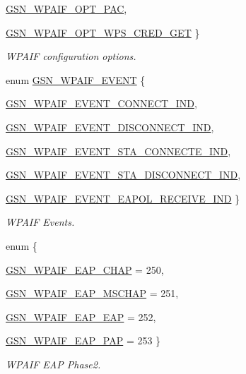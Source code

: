 \begin{DoxyCompactItemize}
\par
\hyperlink{a00687_gga0f2a6686511220638235644511dee215ad7faa17670befa8fc80e316af9a3b733}{GSN\_\-WPAIF\_\-OPT\_\-PAC}, 
\par
\hyperlink{a00687_gga0f2a6686511220638235644511dee215af3bd357d3a9d824dd1e977d66c831f8d}{GSN\_\-WPAIF\_\-OPT\_\-WPS\_\-CRED\_\-GET}
 \}
\begin{DoxyCompactList}\small\item\em WPAIF configuration options. \end{DoxyCompactList}\item 
enum \hyperlink{a00687_gab34b81549296cd8fc0728be0cfa16e87}{GSN\_\-WPAIF\_\-EVENT} \{ \par
\hyperlink{a00687_ggab34b81549296cd8fc0728be0cfa16e87adf4f66b0da0bcca3db633796f43d1222}{GSN\_\-WPAIF\_\-EVENT\_\-CONNECT\_\-IND}, 
\par
\hyperlink{a00687_ggab34b81549296cd8fc0728be0cfa16e87a63abaaa5c7d17b4afc4dff551a26bfa4}{GSN\_\-WPAIF\_\-EVENT\_\-DISCONNECT\_\-IND}, 
\par
\hyperlink{a00687_ggab34b81549296cd8fc0728be0cfa16e87a4b28b3c400f21b493ec3d005b365a07d}{GSN\_\-WPAIF\_\-EVENT\_\-STA\_\-CONNECTE\_\-IND}, 
\par
\hyperlink{a00687_ggab34b81549296cd8fc0728be0cfa16e87a8fa700eb1fdc0dcf80f2b33af0ec50c1}{GSN\_\-WPAIF\_\-EVENT\_\-STA\_\-DISCONNECT\_\-IND}, 
\par
\hyperlink{a00687_ggab34b81549296cd8fc0728be0cfa16e87a064f89c4740c28020afc8b7a494a30ba}{GSN\_\-WPAIF\_\-EVENT\_\-EAPOL\_\-RECEIVE\_\-IND}
 \}
\begin{DoxyCompactList}\small\item\em WPAIF Events. \end{DoxyCompactList}\item 
enum \{ \par
\hyperlink{a00687_gga80155586fa275b28773c9b203f52cabaa57ccee1d732b55d646bb693db54c68b3}{GSN\_\-WPAIF\_\-EAP\_\-CHAP} =  250, 
\par
\hyperlink{a00687_gga80155586fa275b28773c9b203f52cabaa5d6fefd10ba8ff083da0148f8bf64dd7}{GSN\_\-WPAIF\_\-EAP\_\-MSCHAP} =  251, 
\par
\hyperlink{a00687_gga80155586fa275b28773c9b203f52cabaa2711360a255c4e42bbf0a9100905336c}{GSN\_\-WPAIF\_\-EAP\_\-EAP} =  252, 
\par
\hyperlink{a00687_gga80155586fa275b28773c9b203f52cabaa597f80719023ea574e28f5a25679f284}{GSN\_\-WPAIF\_\-EAP\_\-PAP} =  253
 \}
\begin{DoxyCompactList}\small\item\em WPAIF EAP Phase2. \end{DoxyCompactList}\end{DoxyCompactItemize}
